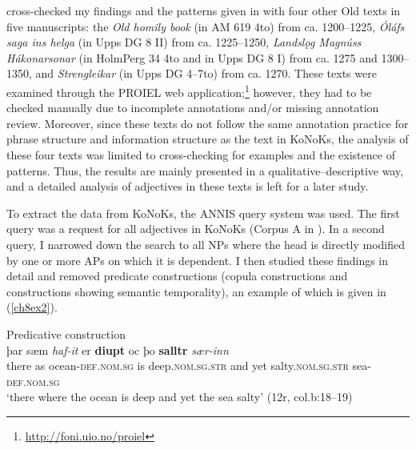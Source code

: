 \documentclass[output=paper,colorlinks,citecolor=brown]{langscibook}
\begin{document}
cross-checked my findings and the patterns given in \citet{Bech17} with
four other Old  texts in five manuscripts: the \emph{Old
 homily book} (in AM 619 4to) from ca. 1200--1225, \emph{Óláfs
saga ins helga} (in Upps DG 8 II) from ca. 1225--1250, \emph{Landslǫg
Magnúss Hákonarsonar} (in HolmPerg 34 4to and in Upps DG 8 I) from ca.
1275 and 1300--1350, and \emph{Strengleikar} (in Upps DG 4--7to) from ca.
1270. These texts were examined through the PROIEL
web application;\footnote{\url{http://foni.uio.no/proiel}} however,
they had to be checked manually due to incomplete
annotations and/or missing annotation review. Moreover, since these texts do not
follow the same annotation practice for phrase structure and information
structure as the text in KoNoKs, the analysis of these four texts was
limited to cross-checking for examples and the existence of patterns.
Thus, the results are mainly presented in a qualitative--descriptive
way, and a detailed analysis of adjectives in these texts is
left for a later study.

To extract the data from KoNoKs, the ANNIS query system was used. The
first query was a request for all adjectives in KoNoKs (Corpus A in
). In a second query, I narrowed down the search to all NPs where
the head  is directly modified by one or more APs on which it is
dependent. I then studied these findings in detail and removed
predicate constructions (copula constructions and constructions showing
semantic temporality), an example of which is given in (\ref{ch8ex2}).

\begin{exe}\label{ch8ex2} 
\ex Predicative construction\\
\gll þar sæm \textit{haf-it} er \textbf{diupt} oc þo \textbf{salltr} \textit{sær-inn}\\
there as ocean-\textsc{def.nom.sg} is deep.\textsc{nom.sg.str} and yet salty.\textsc{nom.sg.str} sea-\textsc{def.nom.sg}\\
\glt `there where the ocean is deep and yet the sea salty' (12r, col.b:18--19)
\end{exe}
\end{document}
